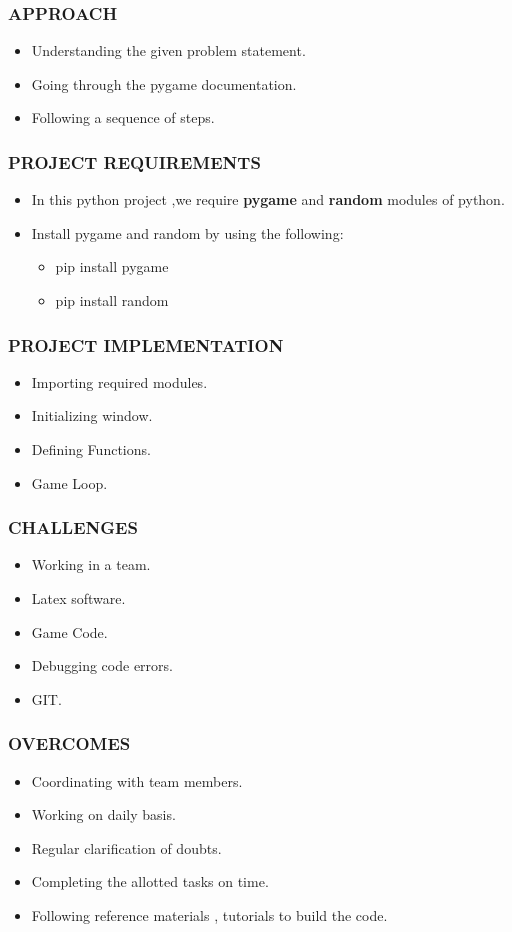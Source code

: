 \documentclass{beamer}
\begin{document}
\begin{frame}
 \frametitle{\bfseries APPROACH}
 \begin{itemize}
 \item Understanding the given problem statement.
 \item Going through the pygame documentation.
 \item Following a sequence of steps.
\end{itemize}
\end{frame}



   
\begin{frame}
\frametitle{\bfseries PROJECT REQUIREMENTS}
\begin{itemize}
\item In this python project ,we require {\bfseries pygame} and {\bfseries random} modules of python.
\medskip
\item Install pygame and random by using the following:
\begin{itemize}
\item pip install pygame
\item pip install random
\end{itemize}
\end{itemize}
\end{frame}

\begin{frame}
\frametitle{\bfseries PROJECT IMPLEMENTATION}
 \begin{itemize}
 \item Importing required modules.
 \item Initializing window.
 \item Defining Functions.
 \item Game Loop.
 \end{itemize}
 \end{frame}
 

\begin{frame}
\frametitle{\bfseries CHALLENGES}

\begin{itemize}
\item Working in a team.
\item Latex software.
\item Game Code.
\item Debugging code errors.
\item GIT.
\end{itemize}
\end{frame}

\begin{frame}
\frametitle{\bfseries OVERCOMES}
\begin{itemize}
\item Coordinating with team members.
\item Working on daily basis.
\item Regular clarification of doubts.
\item Completing the allotted tasks on time.
\item Following reference materials , tutorials to build the code.
\end{itemize}
\end{frame}
\end{document}
